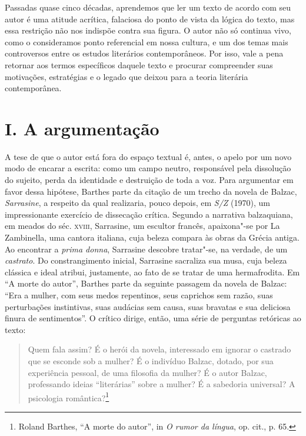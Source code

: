 Passadas quase cinco décadas, aprendemos que ler um texto de acordo com
seu autor é uma atitude acrítica, falaciosa do ponto de vista da lógica
do texto, mas essa restrição não nos indispõe contra sua figura. O autor
não só continua vivo, como o consideramos ponto referencial em nossa
cultura, e um dos temas mais controversos entre os estudos literários
contemporâneos. Por isso, vale a pena retornar aos termos específicos
daquele texto e procurar compreender suas motivações, estratégias e o
legado que deixou para a teoria literária contemporânea.

\section*{I. A argumentação}

A tese de que o autor está fora do espaço textual é, antes, o apelo por
um novo modo de encarar a escrita: como um campo neutro, responsável
pela dissolução do sujeito, perda da identidade e destruição de toda a
voz. Para argumentar em favor dessa hipótese, Barthes parte da citação
de um trecho da novela de Balzac, \emph{Sarrasine}, a respeito da qual
realizaria, pouco depois, em \emph{S/Z} (1970), um impressionante exercício de
dissecação crítica. Segundo a narrativa balzaquiana, em meados do séc.
\textsc{xviii}, Sarrasine, um escultor francês, apaixona"-se por La
Zambinella, uma cantora italiana, cuja beleza compara às obras da Grécia
antiga. Ao encontrar a \emph{prima donna}, Sarrasine descobre tratar"-se, na
verdade, de um \emph{castrato}. Do constrangimento inicial, Sarrasine sacraliza
sua musa, cuja beleza clássica e ideal atribui, justamente, ao fato de
se tratar de uma hermafrodita. Em ``A morte do autor'', Barthes parte da
seguinte passagem da novela de Balzac: ``Era a mulher, com seus medos
repentinos, seus caprichos sem razão, suas perturbações instintivas,
suas audácias sem causa, suas bravatas e sua deliciosa finura de
sentimentos''. O crítico dirige, então, uma série de perguntas retóricas
ao texto:

\begin{quote}
Quem fala assim? É o herói da novela, interessado em ignorar o castrado
que se esconde sob a mulher? É o indivíduo Balzac, dotado, por sua
experiência pessoal, de uma filosofia da mulher? É o autor Balzac,
professando ideias ``literárias'' sobre a mulher? É a sabedoria
universal? A psicologia romântica?\footnote{Roland Barthes, ``A morte do
  autor'', in \emph{O rumor da língua}, op. cit., p. 65.}
\end{quote}

